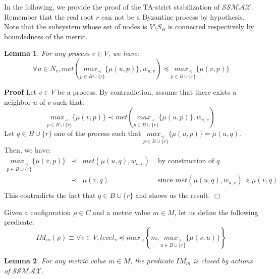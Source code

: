 \documentclass[11pt]{article}
\newenvironment{proof}{\noindent\textbf{Proof}}{\hfill\qed}
\newcommand{\qed}{\hfill$\Box$}
\newtheorem{lem}{Lemma}
\newenvironment{lemma}[1]{\vspace{-0.25cm}\begin{lem}#1}{\end{lem}\vspace{-0.3cm}}
\begin{document}
In the following, we provide the proof of the TA-strict stabilization of $\mathcal{SSMAX}$. Remember that the real root $r$ can not be a Byzantine process by hypothesis. Note that the subsystem whose set of nodes is $V\setminus S_B$ is connected respectively by boundedness of the metric.

\begin{lemma}\label{lem:goodProperty}
For any process $v\in V$, we have:
\[\forall u\in N_v,met\left(\underset{p\in B\cup\{r\}}{max_\prec}\{\mu(u,p)\},w_{u,v}\right)\preceq\underset{p\in B\cup\{r\}}{max_\prec}\{\mu(v,p)\}\]
\end{lemma}

\begin{proof}
Let $v\in V$ be a process. By contradiction, assume that there exists a neighbor $u$ of $v$ such that:
\[\underset{p\in B\cup\{r\}}{max_\prec}\{\mu(v,p)\}\prec met\left(\underset{p\in B\cup\{r\}}{max_\prec}\{\mu(u,p)\},w_{u,v}\right)\]
Let $q\in B\cup\{r\}$ one of the process such that $\underset{p\in B\cup\{r\}}{max_\prec}\{\mu(u,p)\}=\mu(u,q)$. Then, we have:
\[\begin{array}{rcll}
\underset{p\in B\cup\{r\}}{max_\prec}\{\mu(v,p)\}&\prec&met(\mu(u,q),w_{u,v})&\text{ by construction of }q\\
&\prec&\mu(v,q)&\text{ since } met(\mu(u,q),w_{u,v})\preceq \mu(v,q)\\
\end{array}\]
This contradicts the fact that $q\in B\cup\{r\}$ and shows us the result.
\end{proof}

Given a configuration $\rho\in C$ and a metric value $m\in M$, let us define the following predicate: 
\[IM_m(\rho)\equiv \forall v\in V,level_v\preceq max_\prec\left\{m,\underset{u\in B\cup\{r\}}{max_\prec}\{\mu(v,u)\}\right\}\]

\begin{lemma}\label{lem:Imclosed}
For any metric value $m\in M$, the predicate $IM_m$ is closed by actions of $\mathcal{SSMAX}$.
\end{lemma}
\end{document}
